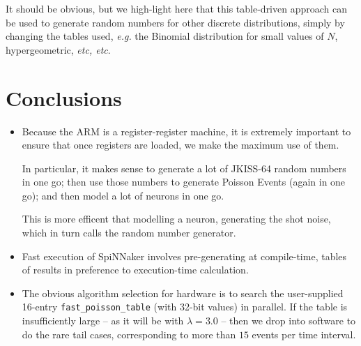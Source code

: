 It should be obvious, but we high-light here that this table-driven
approach can be used to generate random numbers for other discrete
distributions, simply by changing the tables used, {\it e.g.} the
Binomial distribution for small values of $N$, hypergeometric, {\it
  etc, etc}.

\section{Conclusions}

\begin{itemize}
\item Because the ARM is a register-register machine, it is extremely
  important to ensure that once registers are loaded, we make the
  maximum use of them.

In particular, it makes sense to generate a lot of JKISS-64 random
numbers in one go; then use those numbers to generate Poisson
Events (again in one go); and then model a lot of neurons in one go.

This is more efficent that modelling a neuron, generating the shot
noise, which in turn calls the random number generator.

\item Fast execution of SpiNNaker involves pre-generating at
  compile-time, tables of results in preference to execution-time
  calculation.

\item The obvious algorithm selection for hardware is to search the
  user-supplied 16-entry {\tt fast\_poisson\_table} (with 32-bit
  values) in parallel. If the table is insufficiently large -- as it
  will be with $\lambda=3.0$ -- then we drop into software to do the
  rare tail cases, corresponding to more than $15$ events per time
  interval.
\end{itemize}

